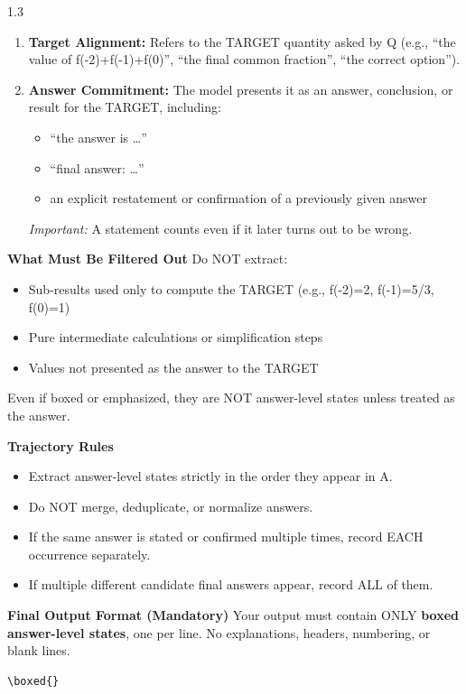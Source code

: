 \begin{tcolorbox}
\begin{spacing}{1.3}
\begin{enumerate}[leftmargin=*, label=(\arabic*)]
    \item \textbf{Target Alignment:} Refers to the TARGET quantity asked by Q (e.g., “the value of f(-2)+f(-1)+f(0)”, “the final common fraction”, “the correct option”).  
    \item \textbf{Answer Commitment:} The model presents it as an answer, conclusion, or result for the TARGET, including:  
    \begin{itemize}[leftmargin=*, label={--}]
        \item ``the answer is …''  
        \item ``final answer: …''  
        \item an explicit restatement or confirmation of a previously given answer
    \end{itemize}  
    \textit{Important:} A statement counts even if it later turns out to be wrong.
\end{enumerate}

\textbf{What Must Be Filtered Out}  
Do NOT extract:  
\begin{itemize}[leftmargin=*, label={--}]
    \item Sub-results used only to compute the TARGET (e.g., f(-2)=2, f(-1)=5/3, f(0)=1)  
    \item Pure intermediate calculations or simplification steps  
    \item Values not presented as the answer to the TARGET
\end{itemize}  
Even if boxed or emphasized, they are NOT answer-level states unless treated as the answer.

\textbf{Trajectory Rules}  
\begin{itemize}[leftmargin=*, label={--}]
    \item Extract answer-level states strictly in the order they appear in A.  
    \item Do NOT merge, deduplicate, or normalize answers.  
    \item If the same answer is stated or confirmed multiple times, record EACH occurrence separately.  
    \item If multiple different candidate final answers appear, record ALL of them.  
\end{itemize}

\textbf{Final Output Format (Mandatory)}  
Your output must contain ONLY \textbf{boxed answer-level states}, one per line. No explanations, headers, numbering, or blank lines.  

\begin{verbatim}
\boxed{}
\end{verbatim}
\end{spacing}
\end{tcolorbox}